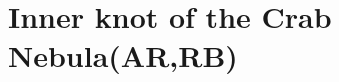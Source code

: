 \section{Inner knot of the Crab Nebula(AR,RB)}
\label{sec:knot}
\cite{Moran_2015}\cite{rudy2015}\cite{Madsen_2015}